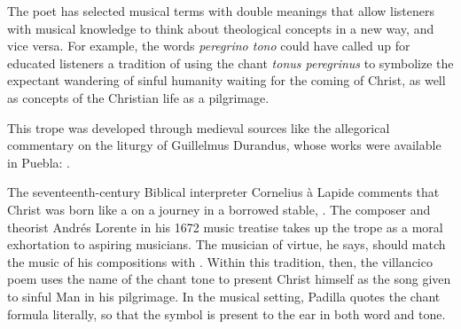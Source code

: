 The poet has selected musical terms with double meanings that allow listeners
with musical knowledge to think about theological concepts in a new way, and
vice versa.
For example, the words \emph{peregrino tono} could have called up for educated
listeners a tradition of using the chant \emph{tonus peregrinus} to symbolize
the expectant wandering of sinful humanity waiting for the coming of Christ, as
well as concepts of the Christian life as a pilgrimage.%
\begin{Footnote}
    This trope was developed through medieval sources like the allegorical
    commentary on the liturgy of Guillelmus Durandus, whose works were available
    in Puebla: \autocite[234]{Wright:Maze}.
\end{Footnote}
The seventeenth-century Biblical interpreter Cornelius à Lapide comments that
Christ was born like a   on a journey in
a borrowed stable, .
    \Autocites
    [884, on :
    .]
    {Lapide:Gospels19C}
    [669, on : 
    .] 
    {Lapide:Gospels19C}
The composer and theorist Andrés Lorente in his 1672 music treatise takes up the
 trope as a moral exhortation to aspiring musicians.
The musician of virtue, he says, should match the music of his compositions with
.%
    \Autocite
    [609: .] 
    {Lorente:Porque}
Within this tradition, then, the villancico poem uses the name of the chant tone
to present Christ himself as the song given to sinful Man in his pilgrimage. 
In the musical setting, Padilla quotes the chant formula literally, so that the
symbol is present to the ear in both word and tone.


